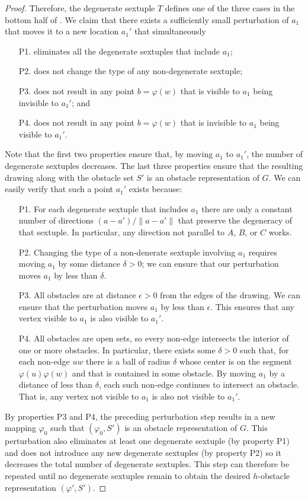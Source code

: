 \documentclass{patmorin}
\begin{document}
\begin{proof}
  Therefore, the degenerate sextuple $T$ defines one of the three cases
  in the bottom half of .  We claim that there
  exists a sufficiently small perturbation of $a_1$ that moves it to a
  new location $a_1'$ that simultaneously
  \begin{enumerate}
    \item[P1.] eliminates all the degenerate sextuples that include $a_1$;
    \item[P2.] does not change the type of any non-degenerate sextuple;
    \item[P3.] does not result in any point $b=\varphi(w)$ that is visible to $a_1$
      being invisible to $a_1'$; and
    \item[P4.] does not result in any point $b=\varphi(w)$ that is invisible to $a_1$
      being visible to $a_1'$.
  \end{enumerate}
  Note that the first two properties ensure that, by moving $a_1$ to $a_1'$,
  the number of degenerate sextuples decreases.  The last three properties
  ensure that the resulting drawing along with the obstacle set $S'$
  is an obstacle representation of $G$. We can easily verify that such
  a point $a_1'$ exists because:
  \begin{enumerate}
    \item[P1.] For each degenerate sextuple that includes $a_1$ there are only
    a constant number of directions $(a-a')/\|a-a'\|$ that preserve the
    degeneracy of that sextuple.  In particular, any direction not parallel
    to $A$, $B$, or $C$ works.
    \item[P2.] Changing the type of a non-denerate sextuple involving $a_1$
    requires moving $a_1$ by some distance $\delta >0$;  we can ensure
    that our perturbation moves $a_1$ by less than $\delta$.  
    \item[P3.] All obstacles are at distance $\epsilon >0$ from the
    edges of the drawing.  We can ensure that the perturbation moves
    $a_1$ by less than $\epsilon$. This ensures that any vertex visible to
    $a_1$ is also visible to $a_1'$.
    \item[P4.] All obstacles are open sets, so every non-edge intersects
    the interior of one or more obstacles.  In particular, there exists
    some $\delta >0$ such that, for each non-edge $uw$ there is a ball of
    radius $\delta$ whose center is on the segment $\varphi(u)\varphi(w)$
    and that is contained in some obstacle.  By moving $a_1$ by a
    distance of less than $\delta$, each such non-edge continues to
    intersect an obstacle.  That is, any vertex not visible to $a_1$
    is also not visible to $a_1'$.
  \end{enumerate}
  By properties P3 and P4, the preceding perturbation step results in
  a new mapping $\varphi_0$ such that $(\varphi_0,S')$ is an obstacle
  representation of $G$.  This perturbation also eliminates at least
  one degenerate sextuple (by property P1) and does not introduce any
  new degenerate sextuples (by property P2) so it decreases the total
  number of degenerate sextuples.  This step can therefore be repeated
  until no degenerate sextuples remain to obtain the desired $h$-obstacle
  representation $(\varphi',S')$.
\end{proof}
\end{document}

